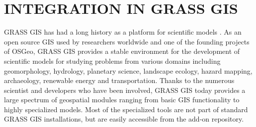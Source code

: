 \documentclass{isprs}
\begin{document}
\section{INTEGRATION IN GRASS GIS}
GRASS GIS has had a long history as a platform for scientific models \cite{chemin2015grass}.
As an open source GIS used by researchers worldwide and one of the founding projects of OSGeo,
GRASS GIS provides a stable environment for the development of
scientific models 
for studying problems from various domains
including geomorphology, hydrology, planetary science, landscape ecology, hazard mapping, archaeology, renewable energy and transportation.
Thanks to the numerous scientist and developers who have been involved, GRASS GIS today provides a large spectrum of geospatial modules
ranging from basic GIS functionality to highly specialized models.
Most of the specialized tools are not part of standard GRASS GIS installations,
but are easily accessible from the add-on repository.
\end{document}
